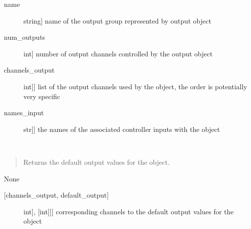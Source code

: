 \documentclass[letterpaper,10pt,english]{sphinxmanual}
\begin{document}
\begin{fulllineitems}
\begin{fulllineitems}
\sphinxAtStartPar
{}
\begin{description}
\item[{name}] \leavevmode{[}string{]}
\sphinxAtStartPar
name of the output group represented by output object

\item[{num\_outputs}] \leavevmode{[}int{]}
\sphinxAtStartPar
number of output channels controlled by the output object

\item[{channels\_output}] \leavevmode{[}{[}int{]}{]}
\sphinxAtStartPar
list of the output channels used by the object, the order is potentially very specific

\item[{names\_input}] \leavevmode{[}{[}str{]}{]}
\sphinxAtStartPar
the names of the associated controller inputs with the object

\end{description}

\end{fulllineitems}


\begin{fulllineitems}
\label{\detokenize{specific:SideLipOutput.SideLipOutput.get_default_outputs}}~\begin{quote}

\sphinxAtStartPar
Returns the default output values for the object.
\end{quote}

\sphinxAtStartPar
{}

\sphinxAtStartPar
None

\sphinxAtStartPar
{}
\begin{description}
\item[{{[}channels\_output, default\_output{]}}] \leavevmode{[}{[}{[}int{]}, {[}int{]}{]}{]}
\sphinxAtStartPar
corresponding channels to the default output values for the object

\end{description}

\end{fulllineitems}



\end{fulllineitems}
\end{document}
